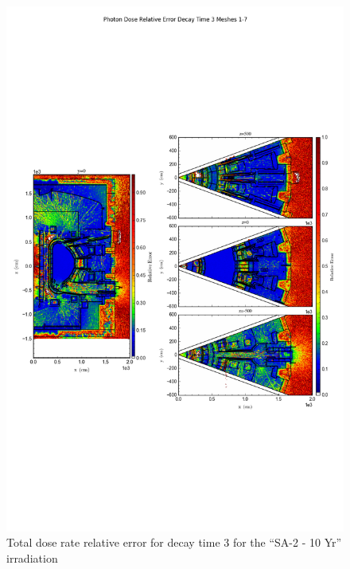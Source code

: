 \documentclass[12pt]{article}
\begin{document}
\begin{figure}[ht!]
\centering
\includegraphics[trim={0cm 8cm, 0cm 8cm},clip,scale=0.75]{../plots/final_model/5year/Photon_Dose_Relative_Error_Decay_Time_3_Meshes_1-7.png}
\caption{Total dose rate relative error for decay time 3 for the ``SA-2 - 10 Yr'' irradiation}
\label{fig:photons_5y_dc3_nob4c_relerr}
\end{figure}
\clearpage
\newpage
\end{document}
